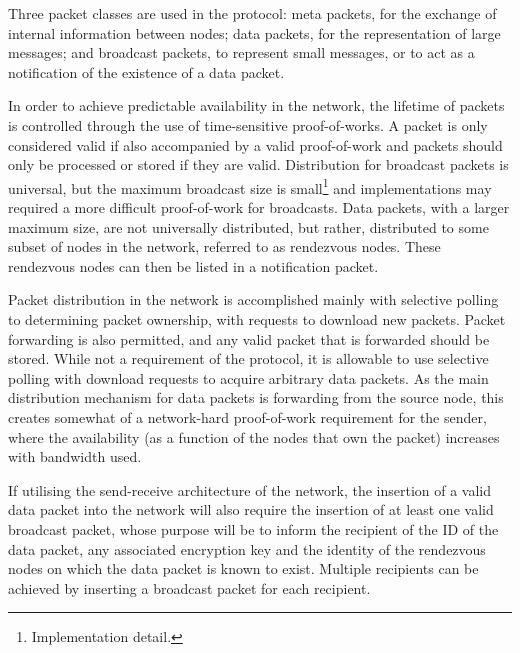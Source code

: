 
Three packet classes are used in the protocol: meta packets, for the exchange of internal information between nodes; data packets, for the representation of large messages; and broadcast packets, to represent small messages, or to act as a notification of the existence of a data packet.

In order to achieve predictable availability in the network, the lifetime of packets is controlled through the use of time-sensitive proof-of-works. A packet is only considered valid if also accompanied by a valid proof-of-work and packets should only be processed or stored if they are valid. Distribution for broadcast packets is universal, but the maximum broadcast size is small\footnote{\label{fn:imp-detail}Implementation detail.} and implementations may required a more difficult proof-of-work for broadcasts. Data packets, with a larger maximum size, are not universally distributed, but rather, distributed to some subset of nodes in the network, referred to as rendezvous nodes. These rendezvous nodes can then be listed in a notification packet.

Packet distribution in the network is accomplished mainly with selective polling to determining packet ownership, with requests to download new packets. Packet forwarding is also permitted, and any valid packet that is forwarded should be stored. While not a requirement of the protocol, it is allowable to use selective polling with download requests to acquire arbitrary data packets. As the main distribution mechanism for data packets is forwarding from the source node, this creates somewhat of a network-hard proof-of-work requirement for the sender, where the availability (as a function of the nodes that own the packet) increases with bandwidth used.

If utilising the send-receive architecture of the network, the insertion of a valid data packet into the network will also require the insertion of at least one valid broadcast packet, whose purpose will be to inform the recipient of the ID of the data packet, any associated encryption key and the identity of the  rendezvous nodes on which the data packet is known to exist. Multiple recipients can be achieved by inserting a broadcast packet for each recipient.

